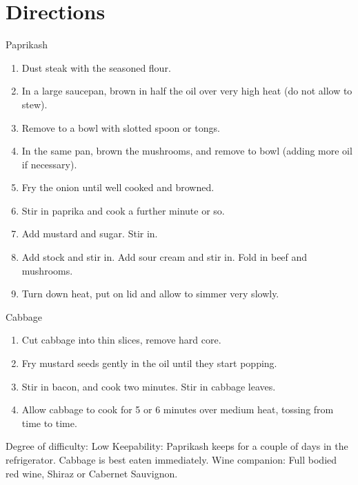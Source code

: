 \section*{Directions}
Paprikash
\begin{enumerate}
	\item Dust steak with the seasoned flour.
	\item In a large saucepan, brown in half the oil over very high heat (do not allow to stew).
	\item Remove to a bowl with slotted spoon or tongs.
	\item In the same pan, brown the mushrooms, and remove to bowl (adding more oil if necessary).
	\item Fry the onion until well cooked and browned.
	\item Stir in paprika and cook a further minute or so.
	\item Add mustard and sugar. Stir in.
	\item Add stock and stir in. Add sour cream and stir in. Fold in beef and mushrooms.
	\item Turn down heat, put on lid and allow to simmer very slowly.
\end{enumerate}
Cabbage
\begin{enumerate}
	\item Cut cabbage into thin slices, remove hard core.
	\item Fry mustard seeds gently in the oil until they start popping.
	\item Stir in bacon, and cook two minutes. Stir in cabbage leaves.
	\item Allow cabbage to cook for 5 or 6 minutes over medium heat, tossing from time to time.
\end{enumerate}
Degree of difficulty: Low
Keepability: Paprikash keeps for a couple of days in the refrigerator. Cabbage is best eaten immediately.
Wine companion: Full bodied red wine, Shiraz or Cabernet Sauvignon.


